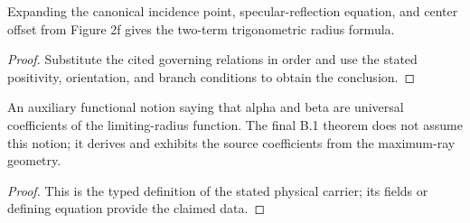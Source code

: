 \begin{lemma}
  \label{lem:physics:IPhO_2026_2_B_1:aux028}
  Expanding the canonical incidence point, specular-reflection equation, and center offset from Figure 2f gives the two-term trigonometric radius formula.
\end{lemma}
\begin{proof}
  Substitute the cited governing relations in order and use the stated positivity, orientation, and branch conditions to obtain the conclusion.
\end{proof}

\begin{definition}
  \label{def:physics:IPhO_2026_2_B_1:aux029}
  An auxiliary functional notion saying that alpha and beta are universal
  coefficients of the limiting-radius function.  The final B.1 theorem does
  not assume this notion; it derives and exhibits the source coefficients
  from the maximum-ray geometry.
\end{definition}
\begin{proof}
  This is the typed definition of the stated physical carrier; its fields or defining equation provide the claimed data.
\end{proof}
